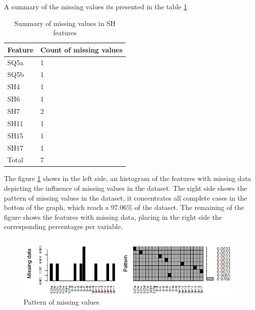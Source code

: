 \documentclass[]{book}
\begin{document}
A summary of the missing values its presented in the table
\ref{summary-of-missing-values-SH}

\begin{table}[ht]
\centering
\caption{Summary of missing values in SH features}
\label{summary-of-missing-values-SH}
\begin{tabular}{|l|l|}
\hline
Feature & Count of missing values \\ \hline
SQ5a    & 1                       \\ \hline
SQ5b    & 1                       \\ \hline
SH4     & 1                       \\ \hline
SH6     & 1                       \\ \hline
SH7     & 2                       \\ \hline
SH11    & 1                       \\ \hline
SH15    & 1                       \\ \hline
SH17    & 1                       \\ \hline
Total   & 7                       \\ \hline
\end{tabular}
\end{table}

The figure \ref{fig:f-pattern-of-missing-data} shows in the left side,
an histogram of the features with missing data depicting the influence
of missing values in the dataset. The right side shows the pattern of
missing values in the dataset, it concentrates all complete cases in the
botton of the graph, which reach a 97.06\% of the dataset. The remaining
of the figure shows the features with missing data, placing in the right
side the corresponding percentages per variable.

\begin{figure}[H]

{\centering \includegraphics[width=0.9\linewidth]{images/pattern-of-missing-data} 

}

\caption{Pattern of missing values}\label{fig:f-pattern-of-missing-data}
\end{figure}
\end{document}
